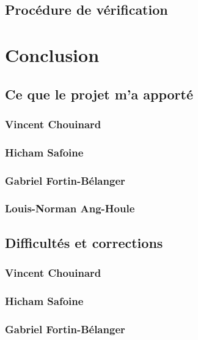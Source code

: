 \documentclass[10pt,a4paper,final]{article}
\begin{document}
\begin{spacing}{1.5}
\subsection{Procédure de vérification}






\pagebreak
\section{Conclusion}

\subsection{Ce que le projet m'a apporté}
\subsubsection{Vincent Chouinard}

\subsubsection{Hicham Safoine}

\subsubsection{Gabriel Fortin-Bélanger}

\subsubsection{Louis-Norman Ang-Houle}



\subsection{Difficultés et corrections}
\subsubsection{Vincent Chouinard}

\subsubsection{Hicham Safoine}

\subsubsection{Gabriel Fortin-Bélanger}


\end{spacing}
\end{document}
